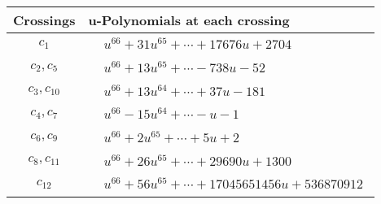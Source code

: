 \documentclass[1p]{elsarticle_modified}
\theoremstyle{definition}
\begin{document}
\begin{tabular}{m{50pt}|m{274pt}}
Crossings & \hspace{64pt}u-Polynomials at each crossing \\
\hline $$\begin{aligned}c_{1}\end{aligned}$$&$\begin{aligned}
&u^{66}+31 u^{65}+\cdots+17676 u+2704
\end{aligned}$\\
\hline $$\begin{aligned}c_{2},c_{5}\end{aligned}$$&$\begin{aligned}
&u^{66}+13 u^{65}+\cdots-738 u-52
\end{aligned}$\\
\hline $$\begin{aligned}c_{3},c_{10}\end{aligned}$$&$\begin{aligned}
&u^{66}+13 u^{64}+\cdots+37 u-181
\end{aligned}$\\
\hline $$\begin{aligned}c_{4},c_{7}\end{aligned}$$&$\begin{aligned}
&u^{66}-15 u^{64}+\cdots- u-1
\end{aligned}$\\
\hline $$\begin{aligned}c_{6},c_{9}\end{aligned}$$&$\begin{aligned}
&u^{66}+2 u^{65}+\cdots+5 u+2
\end{aligned}$\\
\hline $$\begin{aligned}c_{8},c_{11}\end{aligned}$$&$\begin{aligned}
&u^{66}+26 u^{65}+\cdots+29690 u+1300
\end{aligned}$\\
\hline $$\begin{aligned}c_{12}\end{aligned}$$&$\begin{aligned}
&u^{66}+56 u^{65}+\cdots+17045651456 u+536870912
\end{aligned}$\\
\hline
\end{tabular}\\~\\
\newpage\renewcommand{\arraystretch}{1}
\end{document}
